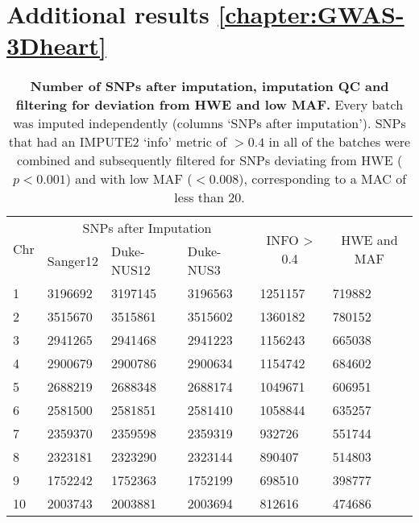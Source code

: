 \section{Additional results \cref{chapter:GWAS-3Dheart}}
\begin{table}[htbp]
  \centering
  \caption[\textbf{Number of SNPs after imputation, imputation QC and filtering for deviation from HWE and low MAF. }]{\textbf{Number of SNPs after imputation, imputation QC and filtering for deviation from HWE and low MAF. } Every batch was imputed independently (columns `SNPs after imputation'). SNPs that had an IMPUTE2 `info' metric of \(> 0.4\) in all of the batches were combined and subsequently filtered for SNPs deviating from HWE (\(p <0.001\)) and with low MAF (\(< 0.008\)), corresponding to a MAC of less than \num{20}. }
    \begin{tabular}{llllll}
    \toprule
    \multicolumn{1}{c}{\multirow{2}[4]{*}{Chr}} & \multicolumn{3}{c}{SNPs after Imputation} & \multicolumn{1}{c}{\multirow{2}[4]{*}{ INFO > 0.4}} & \multicolumn{1}{c}{\multirow{2}[4]{*}{HWE and MAF}} \\
\cmidrule{2-4}          & Sanger12 & Duke-NUS12 & Duke-NUS3 &       &  \\
    \midrule
    \num{1} & \num{3196692} & \num{3197145} & \num{3196563} & \num{1251157} & \num{719882} \\
    \num{2} & \num{3515670} & \num{3515861} & \num{3515602} & \num{1360182} & \num{780152} \\
    \num{3} & \num{2941265} & \num{2941468} & \num{2941223} & \num{1156243} & \num{665038} \\
    \num{4} & \num{2900679} & \num{2900786} & \num{2900634} & \num{1154742} & \num{684602} \\
    \num{5} & \num{2688219} & \num{2688348} & \num{2688174} & \num{1049671} & \num{606951} \\
    \num{6} & \num{2581500} & \num{2581851} & \num{2581410} & \num{1058844} & \num{635257} \\
    \num{7} & \num{2359370} & \num{2359598} & \num{2359319} & \num{932726} & \num{551744} \\
    \num{8} & \num{2323181} & \num{2323290} & \num{2323144} & \num{890407} & \num{514803} \\
    \num{9} & \num{1752242} & \num{1752363} & \num{1752199} & \num{698510} & \num{398777} \\
    \num{10} & \num{2003743} & \num{2003881} & \num{2003694} & \num{812616} & \num{474686} \\

\end{tabular}
\end{table}
